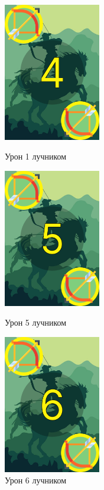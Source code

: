 \documentclass[12pt, a4paper, simple]{eskdtext}
\begin{document}
    \begin{figure}[p!h]
        \centering
        \begin{minipage}{0.24\textwidth}
            \centering
            \includegraphics[height=6cm]
                {../sources/game_cards/build/archer_card_4.png}
            \caption{Урон 1 лучником}
            \label{fig:artillery_card_1}
        \end{minipage}
        \begin{minipage}{0.24\textwidth}
            \centering
            \includegraphics[height=6cm]
                {../sources/game_cards/build/archer_card_5.png}
            \caption{Урон 5 лучником}
            \label{fig:artillery_card_5}
        \end{minipage}
        \begin{minipage}{0.24\textwidth}
            \centering
            \includegraphics[height=6cm]
                {../sources/game_cards/build/archer_card_6.png}
            \caption{Урон 6 лучником}
            \label{fig:artillery_card_6}
        \end{minipage}
    \end{figure}
\end{document}
